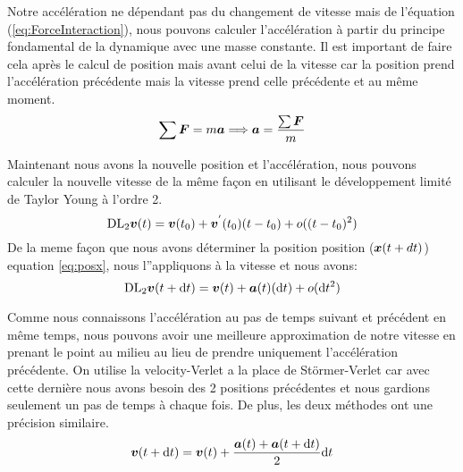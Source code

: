         Notre accélération ne dépendant pas du changement de vitesse mais de l'équation (\ref{eq:ForceInteraction}), nous pouvons calculer l'accélération à partir du principe fondamental de la dynamique avec une masse constante. Il est important de faire cela après le calcul de position mais avant celui de la vitesse car la position prend l'accélération précédente mais la vitesse prend celle précédente et au même moment.
        \begin{equation}
            \label{PFD}
            \sum  \vb*{F} = m\vb*{a} \Longrightarrow \vb*{a} = \frac{\sum \vb*{F}}{m}
        \end{equation}

        Maintenant nous avons la nouvelle position et l'accélération, nous pouvons calculer la nouvelle vitesse de la même façon en utilisant le développement limité de Taylor Young à l'ordre 2.%
        \begin{equation}
            \mathrm{DL}_2\vb*{v}(t) = \vb*{v}(t_0) + \vb*{v}^{'}(t_0)(t-t_0) + o((t-t_0)^2)
        \end{equation}
        De la meme façon que nous avons déterminer la position position ($\vb*{x}(t+dt)$) equation \ref{eq:posx}, nous l''appliquons à la vitesse et nous avons:
        \begin{equation}
            \mathrm{DL}_2\vb*{v}(t+\mathrm{d}t) = \vb*{v}(t) + \vb*{a}(t)(\mathrm{d}t) + o(\mathrm{d}t^2)
        \end{equation}

        Comme nous connaissons l'accélération au pas de temps suivant et précédent en même temps, nous pouvons avoir une meilleure approximation de notre vitesse en prenant le point au milieu au lieu de prendre uniquement l'accélération précédente. On utilise la velocity-Verlet a la place de Störmer-Verlet car avec cette dernière nous avons besoin des 2 positions précédentes et nous gardions seulement un pas de temps à chaque fois. De plus, les deux méthodes ont une précision similaire.
        \begin{equation}
            \label{eq:verletVitesse}
            \vb*{v}(t+\mathrm{d}t) = \vb*{v}(t)+\frac{\vb*{a}(t)+\vb*{a}(t+\mathrm{d}t)}{2}\mathrm{d}t 
        \end{equation}

